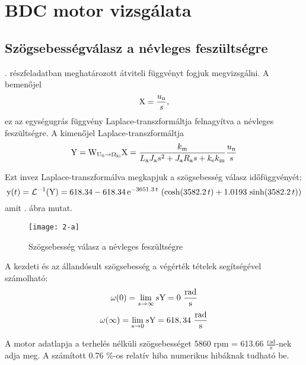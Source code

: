 \section{BDC motor vizsgálata}

\subsection{Szögsebességválasz a névleges feszültségre}

. részfeladatban meghatározott átviteli függvényt fogjuk megvizsgálni.
A bemenőjel
\begin{equation}
	\mathrm{X} = \frac{u_\text{n}}{s},
\end{equation}
ez az egységugrás függvény Laplace-transzformáltja felnagyítva a névleges feszültségre.
A kimenőjel Laplace-transzformáltja
\begin{equation}
	\mathrm{Y} = \mathrm{W}_{\mathrm{U}_0\rightarrow\Omega_\text{ki}}\mathrm{X} = \frac{k_\text{m} }{L_\text{a}J_\text{a} s^2 + J_\text{a}R_\text{a} s + k_\text{e}k_\text{m}}\frac{u_\text{n}}{s}
\end{equation}

Ezt invez Laplace-transzformálva megkapjuk a szögsebesség válasz időfüggvényét:
\begin{equation}
	\mathrm{y}(t) = \mathcal{L}^{-1}(\mathrm{Y}) = 
	618.34 - 618.34\, \mathrm{e}^{- 3651.3\, t}\, \left(\cosh\!\left(3582.2\, t\right) + 1.0193\, \sinh\!\left(3582.2\, t\right)\right)
\end{equation}
amit . ábra mutat.

\begin{figure}[H]
	\centering
	\texttt{[image: 2-a]}
	\caption{Szögsebesség válasz a névleges feszültségre}
	\label{fig:2-a}
\end{figure}

A kezdeti és az állandósult szögsebesség a végérték tételek segítségével számolható:
\begin{equation}
	\omega(0) = \lim\limits_{s\rightarrow \infty}s\mathrm{Y} = 0~\frac{\text{rad}}{\text{s}}
\end{equation}
\begin{equation}
	\omega(\infty) = \lim\limits_{s\rightarrow 0}s\mathrm{Y} = 618,34~\frac{\text{rad}}{\text{s}}
\end{equation}

A motor adatlapja a terhelés nélküli szögsebességet 5860 rpm = 613.66 $\frac{\text{rad}}{\text{s}}$-nek adja meg. A számított 0.76 \%-os relatív hiba numerikus hibáknak tudható be.

